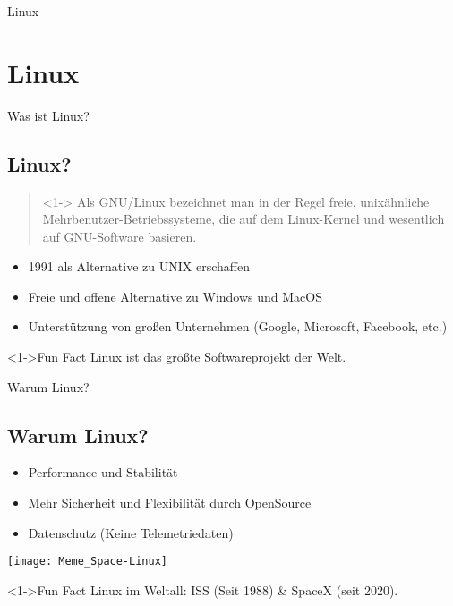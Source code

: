 
\begin{frame}{Linux}
    \section{Linux}\label{sec:Linux}
\end{frame}

\begin{frame}{Was ist Linux?}
    \subsection{Linux?}\label{subsec:linux?}

    \begin{quote}<1->
        Als GNU/Linux bezeichnet man in der Regel freie, unixähnliche Mehrbenutzer-Betriebssysteme, die auf dem Linux-Kernel und wesentlich auf GNU-Software basieren.
    \end{quote}

    \begin{itemize}
        \item<2-> 1991 als Alternative zu UNIX erschaffen
        \item<3-> Freie und offene Alternative zu Windows und MacOS
        \item<4-> Unterstützung von großen Unternehmen (Google, Microsoft, Facebook, etc.)
    \end{itemize}
    \vspace{0.5cm}
    \begin{exampleblock}<1->{Fun Fact}
        Linux ist das größte Softwareprojekt der Welt.
    \end{exampleblock}

\end{frame}

\begin{frame}{Warum Linux?}
    \subsection{Warum Linux?}\label{subsec:warum-linux?}

    \begin{itemize}
        \item Performance und Stabilität
        \item Mehr Sicherheit und Flexibilität durch OpenSource
        \item Datenschutz (Keine Telemetriedaten)
    \end{itemize}
    \vspace{0.5cm}

    \texttt{[image: Meme\_Space-Linux]}
    \begin{exampleblock}<1->{Fun Fact}
        Linux im Weltall: ISS (Seit 1988) \& SpaceX (seit 2020).
    \end{exampleblock}

\end{frame}

